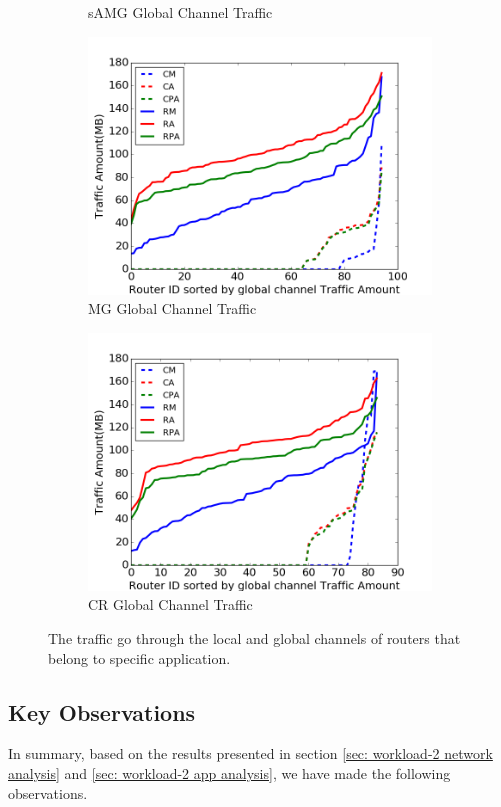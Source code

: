 \documentclass[conference,compsoc]{IEEEtran}
\begin{document}
\begin{figure}[t]
\begin{subfigure}[t]{0.32\textwidth}
        \caption{sAMG Global Channel Traffic}
        \label{fig:syn-samg-gc-traffic}
    \end{subfigure}\hfill
    \hspace{1em}%
    \begin{subfigure}[t]{0.32\textwidth}
        \centering
        \includegraphics[height=1.5 in]{syn-wkld/mg/gc-traffic}
        \caption{MG Global Channel Traffic}
        \label{fig:syn-mg-gc-traffic}
    \end{subfigure}\hfill
    \begin{subfigure}[t]{0.32\textwidth}
        \centering
        \includegraphics[height=1.5 in]{syn-wkld/cr/gc-traffic}
        \caption{CR Global Channel Traffic}
        \label{fig:syn-cr-gc-traffic}
    \end{subfigure}%
   \caption{The traffic go through the local and global channels of routers that belong to specific application.}
   \label{fig:syn-3app-gc-traffic}
\end{figure}


\subsection{Key Observations}

In summary, based on the results presented in section \ref{sec: workload-2 network analysis} and \ref{sec: workload-2 app analysis}, we have made the following observations.


\end{document}
